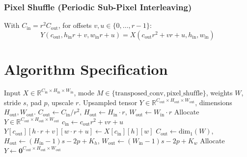 \documentclass[11pt,a4paper]{article}
\theoremstyle{definition}
\begin{document}
\subsubsection{Pixel Shuffle (Periodic Sub-Pixel Interleaving)}
With $C_{\text{in}} = r^2 C_{\text{out}}$, for offsets $v, u \in \{0, \dots, r-1\}$:
\begin{equation}
Y(c_{\text{out}}, h_{\text{in}} r + v, w_{\text{in}} r + u) = X(c_{\text{out}} r^2 + v r + u, h_{\text{in}}, w_{\text{in}})
\end{equation}

\section{Algorithm Specification}

\begin{algorithm}[H]
\caption{Transposed Convolution and Pixel Shuffle Upsampling}
\label{alg:transposed_conv}
\begin{algorithmic}[1]
\Require Input $X \in \mathbb{R}^{C_{\text{in}} \times H_{\text{in}} \times W_{\text{in}}}$, mode $M \in \{\text{transposed\_conv}, \text{pixel\_shuffle}\}$, weights $W$, stride $s$, pad $p$, upscale $r$.
\Ensure Upsampled tensor $Y \in \mathbb{R}^{C_{\text{out}} \times H_{\text{out}} \times W_{\text{out}}}$, dimensions $H_{\text{out}}, W_{\text{out}}$.
    \State $C_{\text{out}} \gets C_{\text{in}} / r^2$, $H_{\text{out}} \gets H_{\text{in}} \cdot r$, $W_{\text{out}} \gets W_{\text{in}} \cdot r$
    \State Allocate $Y \in \mathbb{R}^{C_{\text{out}} \times H_{\text{out}} \times W_{\text{out}}}$
                        \State $c_{\text{in}} \gets c_{\text{out}} r^2 + v r + u$
                        \State $Y[c_{\text{out}}][h \cdot r + v][w \cdot r + u] \gets X[c_{\text{in}}][h][w]$
                    \EndFor
                \EndFor
            \EndFor
        \EndFor
    \EndFor
\Else
    \State $C_{\text{out}} \gets \text{dim}_1(W)$, $H_{\text{out}} \gets (H_{\text{in}} - 1)s - 2p + K_h$, $W_{\text{out}} \gets (W_{\text{in}} - 1)s - 2p + K_w$
    \State Allocate $Y \gets \mathbf{0}^{C_{\text{out}} \times H_{\text{out}} \times W_{\text{out}}}$

\end{algorithmic}
\end{algorithm}
\end{document}
